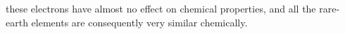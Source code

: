 these electrons have almost no effect on chemical properties, and all the rare-earth elements are consequently very similar chemically.
